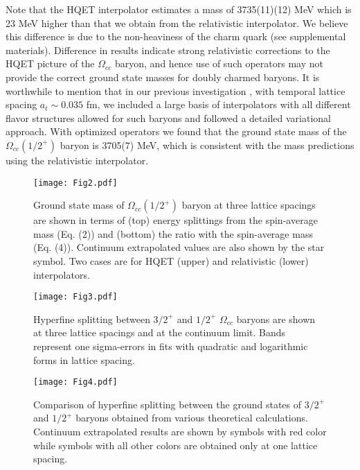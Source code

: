 \documentclass[showkeys,aps,twocolumn,showpacs,preprintnumbers,amsmath,amssymb,prl,letterpaper,floatfix,nofootinbib,superscriptaddress,]{revtex4-1}
\newcommand\bef{\begin{figure}}
\newcommand\eef[1]{\label{fg:#1}\end{figure}}
\begin{document}
{{Note that the HQET interpolator estimates a mass of 3735(11)(12) MeV which is 23 MeV higher than that we obtain from the relativistic interpolator. We believe this difference is due to the non-heaviness of the charm quark (see supplemental materials).
Difference in results indicate strong relativistic corrections to the HQET picture of the $\Omega_{cc}$ baryon, and hence use of such operators may not provide the correct ground state masses for doubly charmed baryons.
It is worthwhile to mention that in our previous investigation \cite{Padmanath:2015jea}, with temporal lattice spacing $a_t \sim 0.035$ fm, we included a large basis of interpolators 
with all different flavor structures allowed for such baryons and followed a detailed 
variational approach.
With optimized operators we found that the ground state mass of the $\Omega_{cc} 
(1/2^{+})$ baryon is 3705(7) MeV,
which is consistent with the mass predictions using the relativistic interpolator.
\bef[tbh]
\centering
\texttt{[image: Fig2.pdf]}
\vspace*{-0.09in}
\caption{Ground state mass of $\Omega_{cc}(1/2^{+})$ baryon at three lattice spacings are shown in terms of (top) energy splittings from the spin-average mass  (Eq. (2)) and (bottom) the ratio with the spin-average mass (Eq. (4)).  Continuum extrapolated values are also shown by the star symbol. Two cases are for HQET (upper) and relativistic (lower) interpolators.}
\eef{fig_ccs_split}
\bef[tbh]
\vspace*{-0.2in}
\centering
\texttt{[image: Fig3.pdf]}
\caption{Hyperfine splitting between $3/2^{+}$ and $1/2^{+}$ $\Omega_{cc}$ baryons are shown at three lattice spacings and at the continuum limit. Bands represent one sigma-errors in fits with quadratic and logarithmic forms in lattice spacing.}
\eef{fig_hfs_lat}

\bef[tbh]
\centering
\texttt{[image: Fig4.pdf]}
\vspace*{-0.09in}
\caption{Comparison of hyperfine splitting between the ground states of $3/2^{+}$ and $1/2^{+}$  baryons obtained from various theoretical calculations. Continuum extrapolated results are shown by symbols with red color while symbols with all other colors are obtained only at one lattice spacing.}
\eef{fig_hfs}

}}
\end{document}
